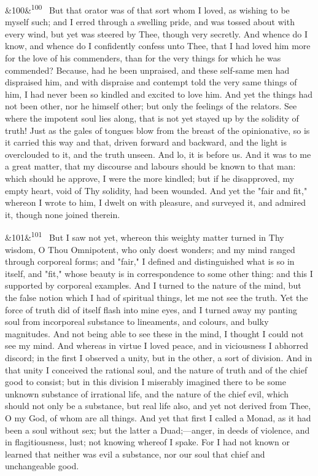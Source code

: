 \documentclass[12pt]{article}
\newcommand{\para}[1][]{\par\noindent\ifx&#1&\else\textsuperscript{\footnotesize #1}~\fi}
\begin{document}
\para[100] But that orator was of that sort whom I loved, as wishing to be myself such; and I erred through a swelling pride, and was tossed about with every wind, but yet was steered by Thee, though very secretly. And whence do I know, and whence do I confidently confess unto Thee, that I had loved him more for the love of his commenders, than for the very things for which he was commended? Because, had he been unpraised, and these self-same men had dispraised him, and with dispraise and contempt told the very same things of him, I had never been so kindled and excited to love him. And yet the things had not been other, nor he himself other; but only the feelings of the relators. See where the impotent soul lies along, that is not yet stayed up by the solidity of truth! Just as the gales of tongues blow from the breast of the opinionative, so is it carried this way and that, driven forward and backward, and the light is overclouded to it, and the truth unseen. And lo, it is before us. And it was to me a great matter, that my discourse and labours should be known to that man: which should he approve, I were the more kindled; but if he disapproved, my empty heart, void of Thy solidity, had been wounded. And yet the "fair and fit," whereon I wrote to him, I dwelt on with pleasure, and surveyed it, and admired it, though none joined therein.

\para[101] But I saw not yet, whereon this weighty matter turned in Thy wisdom, O Thou Omnipotent, who only doest wonders; and my mind ranged through corporeal forms; and "fair," I defined and distinguished what is so in itself, and "fit," whose beauty is in correspondence to some other thing: and this I supported by corporeal examples. And I turned to the nature of the mind, but the false notion which I had of spiritual things, let me not see the truth. Yet the force of truth did of itself flash into mine eyes, and I turned away my panting soul from incorporeal substance to lineaments, and colours, and bulky magnitudes. And not being able to see these in the mind, I thought I could not see my mind. And whereas in virtue I loved peace, and in viciousness I abhorred discord; in the first I observed a unity, but in the other, a sort of division. And in that unity I conceived the rational soul, and the nature of truth and of the chief good to consist; but in this division I miserably imagined there to be some unknown substance of irrational life, and the nature of the chief evil, which should not only be a substance, but real life also, and yet not derived from Thee, O my God, of whom are all things. And yet that first I called a Monad, as it had been a soul without sex; but the latter a Duad;---anger, in deeds of violence, and in flagitiousness, lust; not knowing whereof I spake. For I had not known or learned that neither was evil a substance, nor our soul that chief and unchangeable good.
\end{document}
